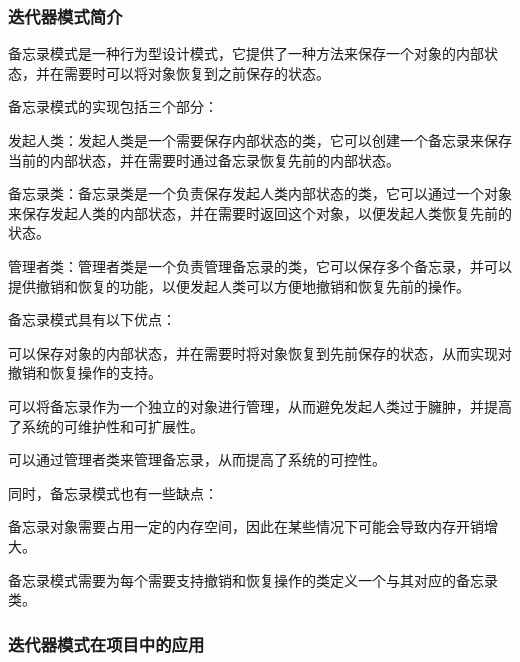 \documentclass[cn,black,12pt,normal]{elegantnote}
\begin{document}
\subsubsection{迭代器模式简介}

备忘录模式是一种行为型设计模式，它提供了一种方法来保存一个对象的内部状态，并在需要时可以将对象恢复到之前保存的状态。

备忘录模式的实现包括三个部分：

发起人类：发起人类是一个需要保存内部状态的类，它可以创建一个备忘录来保存当前的内部状态，并在需要时通过备忘录恢复先前的内部状态。

备忘录类：备忘录类是一个负责保存发起人类内部状态的类，它可以通过一个对象来保存发起人类的内部状态，并在需要时返回这个对象，以便发起人类恢复先前的状态。

管理者类：管理者类是一个负责管理备忘录的类，它可以保存多个备忘录，并可以提供撤销和恢复的功能，以便发起人类可以方便地撤销和恢复先前的操作。

备忘录模式具有以下优点：

可以保存对象的内部状态，并在需要时将对象恢复到先前保存的状态，从而实现对撤销和恢复操作的支持。

可以将备忘录作为一个独立的对象进行管理，从而避免发起人类过于臃肿，并提高了系统的可维护性和可扩展性。

可以通过管理者类来管理备忘录，从而提高了系统的可控性。

同时，备忘录模式也有一些缺点：

备忘录对象需要占用一定的内存空间，因此在某些情况下可能会导致内存开销增大。

备忘录模式需要为每个需要支持撤销和恢复操作的类定义一个与其对应的备忘录类。

\subsubsection{迭代器模式在项目中的应用}
\end{document}
